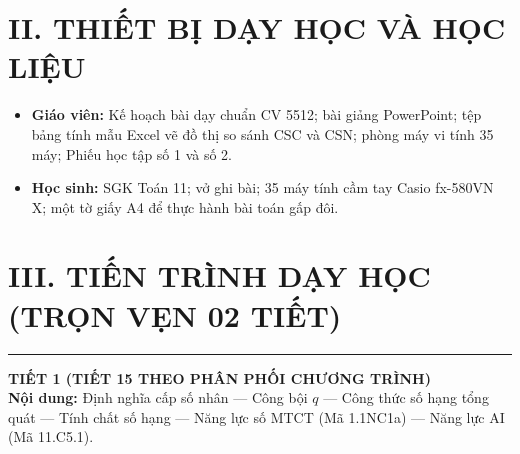\documentclass[12pt, a4paper]{article}
\begin{document}
\section*{II. THIẾT BỊ DẠY HỌC VÀ HỌC LIỆU}
\begin{itemize}[leftmargin=1.5em]
    \item \textbf{Giáo viên:} Kế hoạch bài dạy chuẩn CV 5512; bài giảng PowerPoint; tệp bảng tính mẫu Excel vẽ đồ thị so sánh CSC và CSN; phòng máy vi tính 35 máy; Phiếu học tập số 1 và số 2.
    \item \textbf{Học sinh:} SGK Toán 11; vở ghi bài; 35 máy tính cầm tay Casio fx-580VN X; một tờ giấy A4 để thực hành bài toán gấp đôi.
\end{itemize}


\section*{III. TIẾN TRÌNH DẠY HỌC (TRỌN VẸN 02 TIẾT)}


\begin{center}
\end{center}


\vspace{1em}
\hrule
\vspace{0.8em}


{\large \textbf{TIẾT 1 (TIẾT 15 THEO PHÂN PHỐI CHƯƠNG TRÌNH)}}\\[0.3em]
\textbf{Nội dung:} Định nghĩa cấp số nhân --- Công bội $q$ --- Công thức số hạng tổng quát --- Tính chất số hạng --- Năng lực số MTCT (Mã 1.1NC1a) --- Năng lực AI (Mã 11.C5.1).
\end{document}
